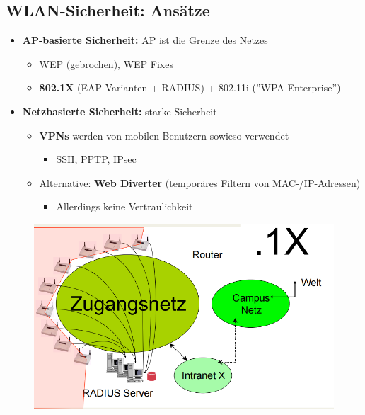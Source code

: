 \documentclass[openany]{book}
\begin{document}
\subsection{WLAN-Sicherheit: Ansätze}

\begin{itemize}
    \item \textbf{AP-basierte Sicherheit:} AP ist die Grenze des Netzes
    \begin{itemize}
        \item WEP (gebrochen), WEP Fixes
        \item \textbf{802.1X} (EAP-Varianten + RADIUS) + 802.11i (''WPA-Enterprise'')
    \end{itemize}
    \item \textbf{Netzbasierte Sicherheit:} starke Sicherheit
    \begin{itemize}
        \item \textbf{VPNs} werden von mobilen Benutzern sowieso verwendet
        \begin{itemize}
            \item SSH, PPTP, IPsec
        \end{itemize}
        \item Alternative: \textbf{Web Diverter} (temporäres Filtern von MAC-/IP-Adressen)
        \begin{itemize}
            \item Allerdings keine Vertraulichkeit
        \end{itemize}
    \end{itemize}
\end{itemize}

\begin{figure}[h!]
    \centering
    \includegraphics[width=0.85\linewidth]{Pics/1X.PNG}
\end{figure}
\end{document}
